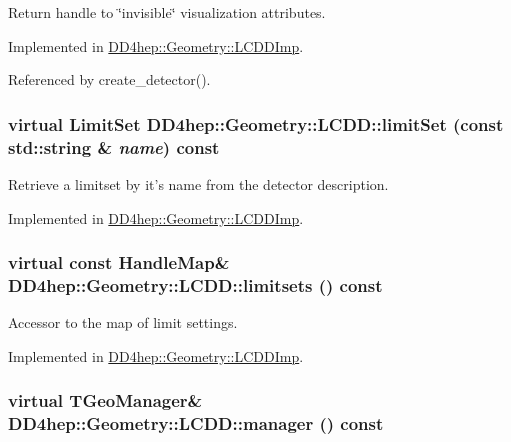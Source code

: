 Return handle to \char`\"{}invisible\char`\"{} visualization attributes. 

Implemented in \hyperlink{class_d_d4hep_1_1_geometry_1_1_l_c_d_d_imp_acd728b63a476d036e305dcd5fc82cd9d}{DD4hep::Geometry::LCDDImp}.

Referenced by create\_\-detector().\hypertarget{class_d_d4hep_1_1_geometry_1_1_l_c_d_d_a7e98996675e9c00d6b64010415511813}{
\subsubsection[{limitSet}]{\setlength{\rightskip}{0pt plus 5cm}virtual {\bf LimitSet} DD4hep::Geometry::LCDD::limitSet (const std::string \& {\em name}) const}}
\label{class_d_d4hep_1_1_geometry_1_1_l_c_d_d_a7e98996675e9c00d6b64010415511813}


Retrieve a limitset by it's name from the detector description. 

Implemented in \hyperlink{class_d_d4hep_1_1_geometry_1_1_l_c_d_d_imp_a1c46d8eb90566d0d9644ff42d2803f00}{DD4hep::Geometry::LCDDImp}.\hypertarget{class_d_d4hep_1_1_geometry_1_1_l_c_d_d_aeacdfb972606fef31bc1b69e6e982956}{
\subsubsection[{limitsets}]{\setlength{\rightskip}{0pt plus 5cm}virtual const {\bf HandleMap}\& DD4hep::Geometry::LCDD::limitsets () const}}
\label{class_d_d4hep_1_1_geometry_1_1_l_c_d_d_aeacdfb972606fef31bc1b69e6e982956}


Accessor to the map of limit settings. 

Implemented in \hyperlink{class_d_d4hep_1_1_geometry_1_1_l_c_d_d_imp_a6716761058e0530f528c669b4b0f0671}{DD4hep::Geometry::LCDDImp}.\hypertarget{class_d_d4hep_1_1_geometry_1_1_l_c_d_d_af209f1ecaad7336e14ffee002215aa93}{
\subsubsection[{manager}]{\setlength{\rightskip}{0pt plus 5cm}virtual TGeoManager\& DD4hep::Geometry::LCDD::manager () const}}
\label{class_d_d4hep_1_1_geometry_1_1_l_c_d_d_af209f1ecaad7336e14ffee002215aa93}


